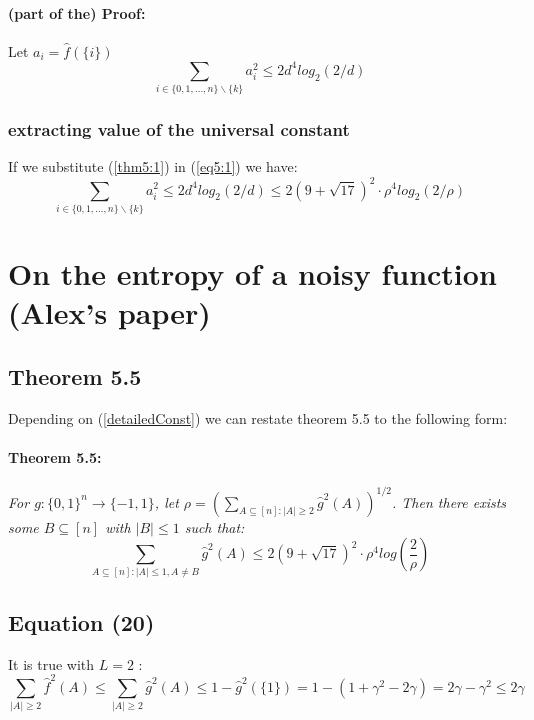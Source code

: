 \documentclass{article}
\begin{document}
				\paragraph{(part of the) Proof:}
					Let $a_i = \hat{f}(\{i\})$
					\begin{equation} \label{eq5:1}
						\sum_{i \in \{0,1, \dots , n\} \backslash \{k\}} a_i^2 \leq 2d^4log_2(2/d)
					\end{equation}		
			\subsubsection{extracting value of the universal constant}
				If we substitute (\ref{thm5:1}) in (\ref{eq5:1}) we have:
				\begin{equation} \label{detailedConst}
					\sum_{i \in \{0,1, \dots , n\} \backslash \{k\}} a_i^2 
					\leq 2d^4log_2(2/d) 
					\leq 2 \left( 9 + \sqrt{17} \right) ^ 2 \cdot \rho^4 log_2(2/\rho)
				\end{equation}
	
	
	\newpage
	\section{On the entropy of a noisy function (Alex's paper)}
		\subsection{Theorem 5.5}
			Depending on (\ref{detailedConst}) we can restate theorem 5.5 to the following form:
			\paragraph{Theorem 5.5:} \textit{For $ g: \{0,1\}^n \rightarrow \{-1,1\}$, let $\rho = \left( \sum_{A \subseteq [n]: |A| \geq 2} \hat{g}^2(A) \right) ^ {1/2} $. Then there exists some $ B \subseteq [n]$ with $|B| \leq 1$ such that:}
				$$  \sum_{A \subseteq [n]: |A| \leq 1, A \neq B} \hat{g}^2 (A) \leq 2 \left( 9 + \sqrt{17} \right)^2 \cdot \rho^4 log \left( \frac{2}{\rho} \right) $$
	
		\subsection{Equation (20)}
			It is true with $L=2$ :
			\begin{equation} \label{eq:20}
				\sum_{|A| \geq 2} \hat{f}^2 (A) 
				\leq \sum_{|A| \geq 2} \hat{g}^2 (A) 
				\leq 1 - \hat{g}^2(\{1\}) = 1 - \left( 1 + \gamma^2 - 2 \gamma \right) = 2 \gamma - \gamma^2 
				\leq 2 \gamma
			\end{equation}
	
\end{document}

